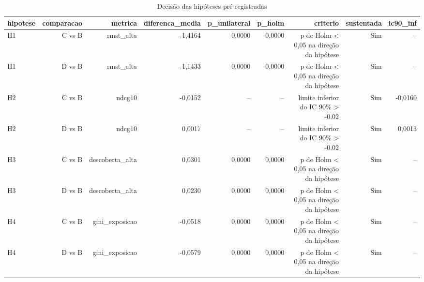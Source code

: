 \begin{table}[ht]
\centering
\caption{Decisão das hipóteses pré-registradas}
\label{tab:hipoteses}
\begin{tabular}{lrrrrrrrr}
\hline
\textbf{hipotese} & \textbf{comparacao} & \textbf{metrica} & \textbf{diferenca\_media} & \textbf{p\_unilateral} & \textbf{p\_holm} & \textbf{criterio} & \textbf{sustentada} & \textbf{ic90\_inf} \\
\hline
H1 & C vs B & rmst\_alta & -1,4164 & 0,0000 & 0,0000 & p de Holm < 0,05 na direção da hipótese & Sim & -- \\
H1 & D vs B & rmst\_alta & -1,1433 & 0,0000 & 0,0000 & p de Holm < 0,05 na direção da hipótese & Sim & -- \\
H2 & C vs B & ndcg10 & -0,0152 & -- & -- & limite inferior do IC 90\% > -0.02 & Sim & -0,0160 \\
H2 & D vs B & ndcg10 & 0,0017 & -- & -- & limite inferior do IC 90\% > -0.02 & Sim & 0,0013 \\
H3 & C vs B & descoberta\_alta & 0,0301 & 0,0000 & 0,0000 & p de Holm < 0,05 na direção da hipótese & Sim & -- \\
H3 & D vs B & descoberta\_alta & 0,0230 & 0,0000 & 0,0000 & p de Holm < 0,05 na direção da hipótese & Sim & -- \\
H4 & C vs B & gini\_exposicao & -0,0518 & 0,0000 & 0,0000 & p de Holm < 0,05 na direção da hipótese & Sim & -- \\
H4 & D vs B & gini\_exposicao & -0,0579 & 0,0000 & 0,0000 & p de Holm < 0,05 na direção da hipótese & Sim & -- \\
\hline
\end{tabular}
\end{table}
